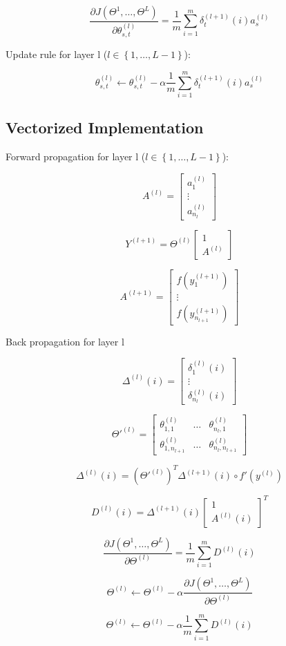 \documentclass[a4, article]{article}
\begin{document}
\[
\frac{\partial J(\Theta^1, \dots, \Theta^L)}{\partial \theta_{s, t}^{(l)}} =
\frac{1}{m} \sum_{i=1}^m \delta_t^{(l+1)} \left( i \right) a_s^{(l)}
\]

Update rule for layer l ($l \in \left\{ 1, \dots, L-1 \right\} $):

\[
\theta_{s, t}^{(l)} \leftarrow \theta_{s, t}^{(l)} - \alpha \frac{1}{m} \sum_{i=1}^m \delta_t^{(l+1)} \left( i \right) a_s^{(l)}
\]

\subsection{Vectorized Implementation}

Forward propagation for layer l ($l \in \left\{ 1, \dots, L-1 \right\} $):

\[
A^{(l)} =
\left[
\begin{array}{c}
a_1^{(l)} \\
\vdots \\
a_{n_l}^{(l)}
\end{array}
\right]
\]

\[Y^{(l+1)} = \Theta^{(l)} 
\left[
\begin{array}{c}
1 \\
A^{(l)}
\end{array}
\right]
\]

\[
A^{(l+1)} =
\left[
\begin{array}{c}
f(y_1^{(l+1)}) \\
\vdots \\
f(y_{n_{l+1}}^{(l+1)})
\end{array}
\right]
\]


Back propagation for layer l

\[
\Delta^{(l)}(i) = 
\left[
\begin{array}{c}
\delta_1^{(l)}(i) \\
\vdots \\
\delta_{n_l}^{(l)}(i)
\end{array}
\right]
\]

\[
\Theta'^{(l)} =
\left[
\begin{array}{ccc}
\theta_{1, 1}^{(l)} & \dots & \theta_{n_l, 1}^{(l)} \\ 
\theta_{1, n_{l+1}}^{(l)} & \dots & \theta_{n_l, n_{l+1}}^{(l)}
\end{array}
\right]
\]

\[ \Delta^{(l)}(i) = (\Theta'^{(l)})^T \Delta^{(l+1)}(i) \circ f'(y^{(l)}) \]

\[ D^{(l)}(i) = \Delta^{(l+1)}(i) \left[
\begin{array}{c}
1 \\
A^{(l)}(i)
\end{array}
\right]^T \]

\[
\frac{\partial J(\Theta^1, \dots, \Theta^L)}{\partial \Theta^{(l)}} = 
\frac{1}{m} \sum_{i=1}^m D^{(l)}(i)
\]

\[
\Theta^{(l)} \leftarrow \Theta^{(l)} - \alpha \frac{\partial J(\Theta^1, \dots, \Theta^L)}{\partial \Theta^{(l)}}
\]

\[
\Theta^{(l)} \leftarrow \Theta^{(l)} - \alpha \frac{1}{m} \sum_{i=1}^m D^{(l)}(i)
\]
\end{document}
